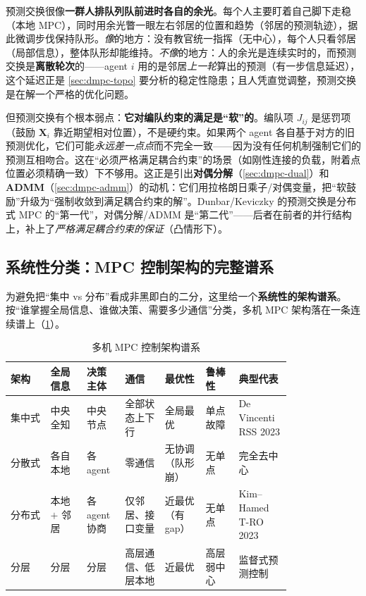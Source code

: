 \begin{insight}\label{ins:dmpc-peripheral}
预测交换很像\textbf{一群人排队列队前进时各自的余光}。每个人主要盯着自己脚下走稳（本地 MPC），同时用余光瞥一眼左右邻居的位置和趋势（邻居的预测轨迹），据此微调步伐保持队形。\emph{像}的地方：没有教官统一指挥（无中心），每个人只看邻居（局部信息），整体队形却能维持。\emph{不像}的地方：人的余光是连续实时的，而预测交换是\textbf{离散轮次}的——agent $i$ 用的是邻居\emph{上一轮}算出的预测（有一步信息延迟），这个延迟正是 \cref{sec:dmpc-topo} 要分析的稳定性隐患；且人凭直觉调整，预测交换是在解一个严格的优化问题。
\end{insight}

但预测交换有个根本弱点：\textbf{它对编队约束的满足是“软”的}。编队项 $J_{ij}$ 是惩罚项（鼓励 $\mathbf{X}_i$ 靠近期望相对位置），不是硬约束。如果两个 agent 各自基于对方的旧预测优化，它们可能\emph{永远差一点点}而不完全一致——因为没有任何机制强制它们的预测互相吻合。这在“必须严格满足耦合约束”的场景（如刚性连接的负载，附着点位置必须精确一致）下不够用。这正是引出\textbf{对偶分解}（\cref{sec:dmpc-dual}）和 \textbf{ADMM}（\cref{sec:dmpc-admm}）的动机：它们用拉格朗日乘子/对偶变量，把“软鼓励”升级为“强制收敛到满足耦合约束的解”。Dunbar/Keviczky 的预测交换是分布式 MPC 的“第一代”，对偶分解/ADMM 是“第二代”——后者在前者的并行结构上，补上了\emph{严格满足耦合约束的保证}（凸情形下）。

\subsection{系统性分类：MPC 控制架构的完整谱系}
\label{sec:dmpc-spectrum}

为避免把“集中 vs 分布”看成非黑即白的二分，这里给一个\textbf{系统性的架构谱系}。按“谁掌握全局信息、谁做决策、需要多少通信”分类，多机 MPC 架构落在一条连续谱上（\cref{tab:dmpc-spectrum}）。

\begin{table}[H]\centering\small
\caption{多机 MPC 控制架构谱系}
\label{tab:dmpc-spectrum}
\begin{tabular}{p{0.12\linewidth}p{0.11\linewidth}p{0.10\linewidth}p{0.12\linewidth}p{0.11\linewidth}p{0.10\linewidth}p{0.13\linewidth}}
\toprule
架构 & 全局信息 & 决策主体 & 通信 & 最优性 & 鲁棒性 & 典型代表 \\
\midrule
集中式 & 中央全知 & 中央节点 & 全部状态上下行 & 全局最优 & 单点故障 & De Vincenti RSS 2023\cite{devincenti2023centralized} \\
分散式 & 各自本地 & 各 agent & 零通信 & 无协调（队形崩） & 无单点 & 完全去中心 \\
分布式 & 本地 $+$ 邻居 & 各 agent 协商 & 仅邻居、接口变量 & 近最优（有 gap） & 无单点 & Kim--Hamed T-RO 2023\cite{kim2023layered} \\
分层 & 分层 & 分层 & 高层通信、低层本地 & 近最优 & 高层弱中心 & 监督式预测控制\cite{kim2022cooperative} \\
\bottomrule
\end{tabular}
\end{table}

